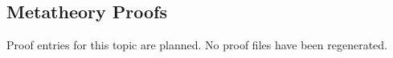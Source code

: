 \subsection*{Metatheory Proofs}

Proof entries for this topic are planned. No proof files have been regenerated.
